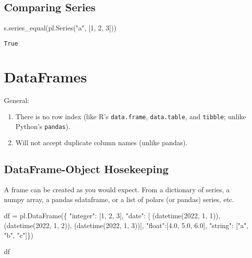 \documentclass[
  letterpaper,
  DIV=11,
  numbers=noendperiod]{scrartcl}
\newenvironment{Shaded}{\begin{snugshade}}{\end{snugshade}}
\newcommand{\DecValTok}[1]{\textcolor[rgb]{0.68,0.00,0.00}{#1}}
\newcommand{\FloatTok}[1]{\textcolor[rgb]{0.68,0.00,0.00}{#1}}
\newcommand{\NormalTok}[1]{\textcolor[rgb]{0.00,0.23,0.31}{#1}}
\newcommand{\OperatorTok}[1]{\textcolor[rgb]{0.37,0.37,0.37}{#1}}
\newcommand{\StringTok}[1]{\textcolor[rgb]{0.13,0.47,0.30}{#1}}
\providecommand{\tightlist}{%
  \setlength{\itemsep}{0pt}\setlength{\parskip}{0pt}}\usepackage{longtable,booktabs,array}
\begin{document}
\hypertarget{comparing-series}{%
\subsection{Comparing Series}\label{comparing-series}}

\begin{Shaded}
\begin{Highlighting}[]
\NormalTok{s.series\_equal(pl.Series(}\StringTok{"a"}\NormalTok{, [}\DecValTok{1}\NormalTok{, }\DecValTok{2}\NormalTok{, }\DecValTok{3}\NormalTok{]))}
\end{Highlighting}
\end{Shaded}

\begin{verbatim}
True
\end{verbatim}

\hypertarget{dataframes}{%
\section{DataFrames}\label{dataframes}}

General:

\begin{enumerate}
\def\labelenumi{\arabic{enumi}.}
\tightlist
\item
  There is no row index (like R's \texttt{data.frame},
  \texttt{data.table}, and \texttt{tibble}; unlike Python's
  \texttt{pandas}).
\item
  Will not accept duplicate column names (unlike pandas).
\end{enumerate}

\hypertarget{dataframe-object-hosekeeping}{%
\subsection{DataFrame-Object
Hosekeeping}\label{dataframe-object-hosekeeping}}

A frame can be created as you would expect. From a dictionary of series,
a numpy array, a pandas sdataframe, or a list of polars (or pandas)
series, etc.

\begin{Shaded}
\begin{Highlighting}[]
\NormalTok{df }\OperatorTok{=}\NormalTok{ pl.DataFrame(\{}
  \StringTok{"integer"}\NormalTok{: [}\DecValTok{1}\NormalTok{, }\DecValTok{2}\NormalTok{, }\DecValTok{3}\NormalTok{], }
  \StringTok{"date"}\NormalTok{: [}
\NormalTok{    (datetime(}\DecValTok{2022}\NormalTok{, }\DecValTok{1}\NormalTok{, }\DecValTok{1}\NormalTok{)), }
\NormalTok{    (datetime(}\DecValTok{2022}\NormalTok{, }\DecValTok{1}\NormalTok{, }\DecValTok{2}\NormalTok{)), }
\NormalTok{    (datetime(}\DecValTok{2022}\NormalTok{, }\DecValTok{1}\NormalTok{, }\DecValTok{3}\NormalTok{))], }
    \StringTok{"float"}\NormalTok{:[}\FloatTok{4.0}\NormalTok{, }\FloatTok{5.0}\NormalTok{, }\FloatTok{6.0}\NormalTok{],}
    \StringTok{"string"}\NormalTok{: [}\StringTok{"a"}\NormalTok{, }\StringTok{"b"}\NormalTok{, }\StringTok{"c"}\NormalTok{]\})}

\NormalTok{df}
\end{Highlighting}
\end{Shaded}
\end{document}
